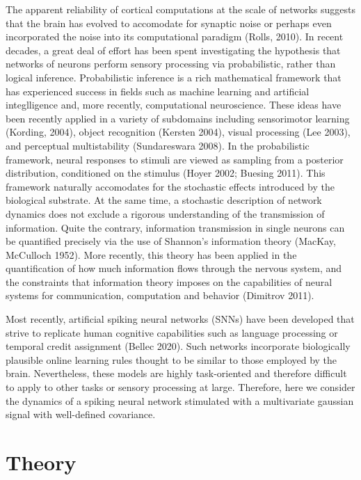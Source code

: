 \documentclass{ucetd}
\begin{document}
The apparent reliability of cortical computations at the scale of networks suggests that the brain has evolved to accomodate for synaptic noise or perhaps even incorporated the noise into its computational paradigm (Rolls, 2010). In recent decades, a great deal of effort has been spent investigating the hypothesis that networks of neurons perform sensory processing via probabilistic, rather than logical inference. Probabilistic inference is a rich mathematical framework that has experienced success in fields such as machine learning and artificial integlligence and, more recently, computational neuroscience. These ideas have been recently applied in a variety of subdomains including sensorimotor learning (Kording, 2004), object recognition (Kersten 2004), visual processing (Lee 2003), and perceptual multistability (Sundareswara 2008). In the probabilistic framework, neural responses to stimuli are viewed as sampling from a posterior distribution, conditioned on the stimulus (Hoyer 2002; Buesing 2011). This framework naturally accomodates for the stochastic effects introduced by the biological substrate. At the same time, a stochastic description of network dynamics does not exclude a rigorous understanding of the transmission of information. Quite the contrary, information transmission in single neurons can be quantified precisely via the use of Shannon's information theory (MacKay, McCulloch 1952). More recently, this theory has been applied in the quantification of how much information flows through the nervous system, and the constraints that information theory imposes on the capabilities of neural systems for communication, computation and behavior (Dimitrov 2011).

Most recently, artificial spiking neural networks (SNNs) have been developed that strive to replicate human cognitive capabilities such as language processing or temporal credit assignment (Bellec 2020). Such networks incorporate biologically plausible online learning rules thought to be similar to those employed by the brain.
Nevertheless, these models are highly task-oriented and therefore difficult to apply to other tasks or sensory processing at large. Therefore, here we consider the dynamics of a spiking neural network stimulated with a multivariate gaussian signal with well-defined covariance. 


\section{Theory}
\end{document}
